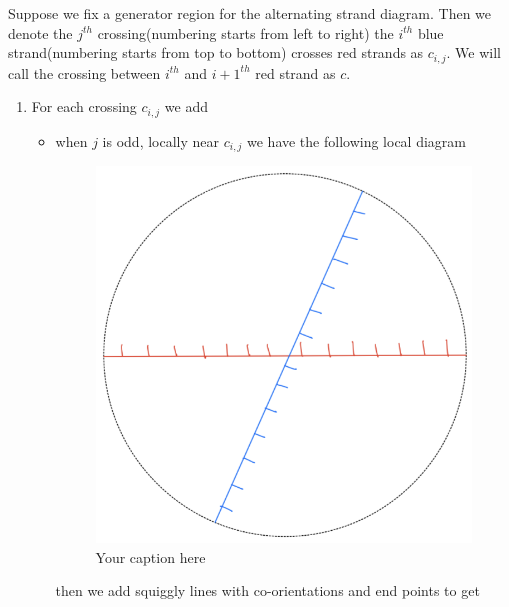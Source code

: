 \begin{definition}
Suppose we fix a generator region for the alternating strand diagram. Then we denote the $j^{th}$ crossing(numbering starts from left to right) the $i^{th}$ blue strand(numbering starts from top to bottom) crosses red strands as $c_{i,j}$. We will call the crossing between $i^{th}$ and $i+1^{th}$ red strand as $c$.
\begin{enumerate}[label = (\roman*)]
\item For each crossing $c_{i,j}$ we add 
\begin{itemize}
\item when $j$ is odd, locally near $c_{i,j}$ we have the following local diagram
\begin{figure}[H] 
    \centering
    \includegraphics[scale = 0.95]{diagrams/local_systems_on_as_diagrams/3.png} 
    \caption{Your caption here}
    \label{fig:your-label}
\end{figure}
then we add squiggly lines with co-orientations and end points to get
\begin{figure}[H] 
    \centering

\end{figure}
\end{itemize}
\end{enumerate}
\end{definition}
